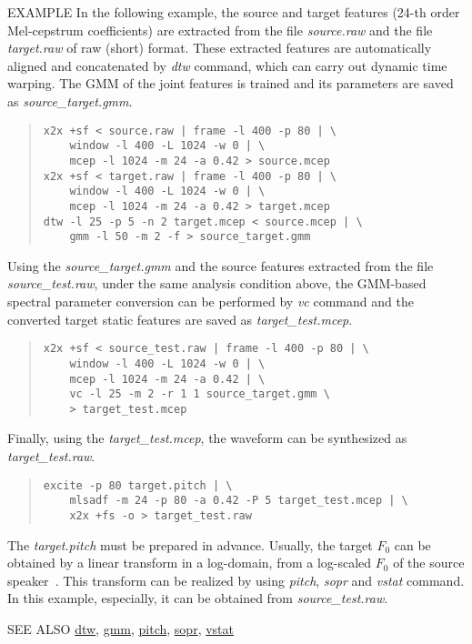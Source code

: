\begin{qsection}{EXAMPLE}
In the following example, the source and target features (24-th order Mel-cepstrum
coefficients) are extracted from the file {\em source.raw} and the file {\em
target.raw} of raw (short) format.  These extracted features are automatically
aligned and concatenated by {\em dtw} command, which can carry out dynamic time
warping.  The GMM of the joint features is trained and its parameters are saved
as {\em source\_target.gmm}.
\begin{quote}
\verb!x2x +sf < source.raw | frame -l 400 -p 80 | \! \\
\verb!    window -l 400 -L 1024 -w 0 | \! \\
\verb!    mcep -l 1024 -m 24 -a 0.42 > source.mcep ! \\
\verb!x2x +sf < target.raw | frame -l 400 -p 80 | \! \\
\verb!    window -l 400 -L 1024 -w 0 | \! \\
\verb!    mcep -l 1024 -m 24 -a 0.42 > target.mcep ! \\
\verb!dtw -l 25 -p 5 -n 2 target.mcep < source.mcep | \! \\
\verb!    gmm -l 50 -m 2 -f > source_target.gmm!
\end{quote}
Using the {\em source\_target.gmm} and the source features extracted from the file
{\em source\_test.raw}, under the same analysis condition above, the GMM-based
spectral parameter conversion can be performed by {\em vc} command and the converted
target static features are saved as {\em target\_test.mcep}.
\begin{quote}
\verb!x2x +sf < source_test.raw | frame -l 400 -p 80 | \! \\
\verb!    window -l 400 -L 1024 -w 0 | \! \\
\verb!    mcep -l 1024 -m 24 -a 0.42 | \! \\
\verb!    vc -l 25 -m 2 -r 1 1 source_target.gmm \! \\
\verb!    > target_test.mcep!
\end{quote}
Finally, using the {\em target\_test.mcep}, the waveform can be synthesized as {\em
 target\_test.raw}.
\begin{quote}
\verb!excite -p 80 target.pitch | \! \\
\verb!    mlsadf -m 24 -p 80 -a 0.42 -P 5 target_test.mcep | \! \\
\verb!    x2x +fs -o > target_test.raw!
\end{quote}
The {\em target.pitch} must be prepared in advance.  Usually, the target $F_0$ can be
obtained by a linear transform in a log-domain, from a log-scaled $F_0$ of the source
speaker~\cite{ref:vc-IEEETASLP}.  This transform can be realized by using {\em
pitch}, {\em sopr} and {\em vstat} command.  In this example, especially, it can be
obtained from {\em source\_test.raw}.
\end{qsection}

\begin{qsection}{SEE ALSO}
\hyperlink{dtw}{dtw},
\hyperlink{gmm}{gmm},
\hyperlink{pitch}{pitch},
\hyperlink{sopr}{sopr},
\hyperlink{vstat}{vstat}
\end{qsection}
